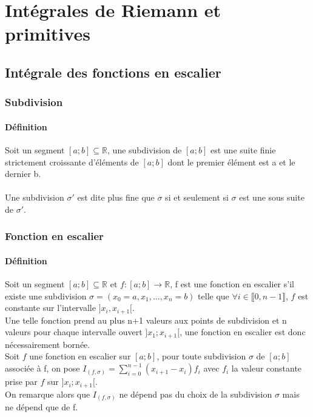 \documentclass[a4paper,10pt]{book} %
\newcommand{\R}{\mathbb{R}}
\begin{document}
\chapter{Intégrales de Riemann et primitives}
\section{Intégrale des fonctions en escalier}
\subsection{Subdivision}
\subsubsection{Définition}
Soit un segment $[a;b] \subseteq \R$, une subdivision de $[a;b]$ est une suite finie strictement croissante d'éléments de $[a;b]$ dont le premier élément est a et le dernier b.\\\\
Une subdivision $\sigma'$ est dite plus fine que $\sigma$ si et seulement si $\sigma$ est une sous suite de $\sigma'$.

\subsection{Fonction en escalier}
\subsubsection{Définition}
Soit un segment $[a;b] \subseteq \R$ et $f : [a;b] \rightarrow \R$,
f est une fonction en escalier s'il existe une subdivision $\sigma=(x_0=a,x_1,...,x_n=b)$ telle que $\forall i\in \llbracket 0,n-1\rrbracket$, $f$ est constante sur l'intervalle $]x_i,x_{i+1}[$.\\

Une telle fonction prend au plus n+1 valeurs aux points de subdivision et n valeurs pour chaque intervalle ouvert $]x_1;x_{i+1}[$, une fonction en escalier est donc nécessairement bornée.\\


Soit $f$ une fonction en escalier sur $[a;b]$, pour toute subdivision $\sigma$ de $[a;b]$ associée à f, on pose $I_{(f,\sigma)}=\sum\limits_{i=0}^{n-1} (x_{i+1}-x_i)f_i$ avec $f_i$ la valeur constante prise par $f$ sur $]x_i;x_{i+1}[$.\\

On remarque alors que $I_{(f,\sigma)}$ ne dépend pas du choix de la subdivision $\sigma$ mais ne dépend que de f.\\
\end{document}
